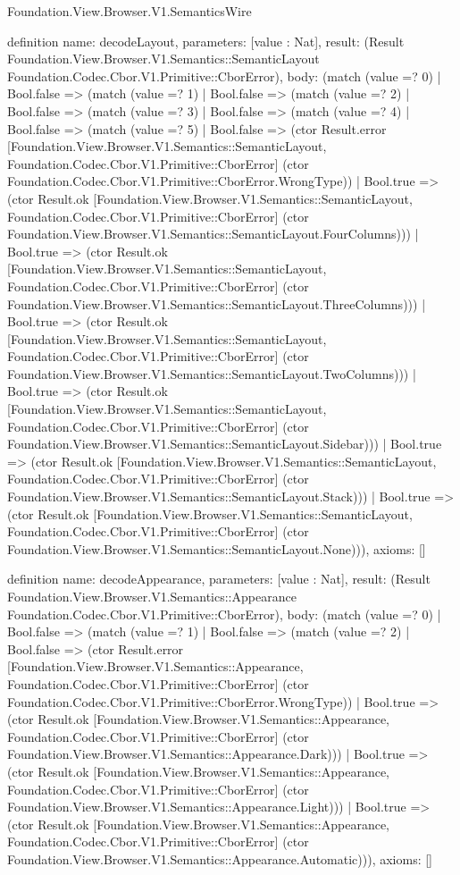 \begin{lexlean}{Foundation.View.Browser.V1.SemanticsWire}
\begin{semanticmodule}
definition{
  name: decodeLayout,
  parameters: [value : Nat],
  result: (Result Foundation.View.Browser.V1.Semantics::SemanticLayout Foundation.Codec.Cbor.V1.Primitive::CborError),
  body: (match (value =? 0)
    | Bool.false => (match (value =? 1)
      | Bool.false => (match (value =? 2)
        | Bool.false => (match (value =? 3)
          | Bool.false => (match (value =? 4)
            | Bool.false => (match (value =? 5)
              | Bool.false => (ctor Result.error [Foundation.View.Browser.V1.Semantics::SemanticLayout, Foundation.Codec.Cbor.V1.Primitive::CborError] (ctor Foundation.Codec.Cbor.V1.Primitive::CborError.WrongType))
              | Bool.true => (ctor Result.ok [Foundation.View.Browser.V1.Semantics::SemanticLayout, Foundation.Codec.Cbor.V1.Primitive::CborError] (ctor Foundation.View.Browser.V1.Semantics::SemanticLayout.FourColumns)))
            | Bool.true => (ctor Result.ok [Foundation.View.Browser.V1.Semantics::SemanticLayout, Foundation.Codec.Cbor.V1.Primitive::CborError] (ctor Foundation.View.Browser.V1.Semantics::SemanticLayout.ThreeColumns)))
          | Bool.true => (ctor Result.ok [Foundation.View.Browser.V1.Semantics::SemanticLayout, Foundation.Codec.Cbor.V1.Primitive::CborError] (ctor Foundation.View.Browser.V1.Semantics::SemanticLayout.TwoColumns)))
        | Bool.true => (ctor Result.ok [Foundation.View.Browser.V1.Semantics::SemanticLayout, Foundation.Codec.Cbor.V1.Primitive::CborError] (ctor Foundation.View.Browser.V1.Semantics::SemanticLayout.Sidebar)))
      | Bool.true => (ctor Result.ok [Foundation.View.Browser.V1.Semantics::SemanticLayout, Foundation.Codec.Cbor.V1.Primitive::CborError] (ctor Foundation.View.Browser.V1.Semantics::SemanticLayout.Stack)))
    | Bool.true => (ctor Result.ok [Foundation.View.Browser.V1.Semantics::SemanticLayout, Foundation.Codec.Cbor.V1.Primitive::CborError] (ctor Foundation.View.Browser.V1.Semantics::SemanticLayout.None))),
  axioms: []
}

definition{
  name: decodeAppearance,
  parameters: [value : Nat],
  result: (Result Foundation.View.Browser.V1.Semantics::Appearance Foundation.Codec.Cbor.V1.Primitive::CborError),
  body: (match (value =? 0)
    | Bool.false => (match (value =? 1)
      | Bool.false => (match (value =? 2)
        | Bool.false => (ctor Result.error [Foundation.View.Browser.V1.Semantics::Appearance, Foundation.Codec.Cbor.V1.Primitive::CborError] (ctor Foundation.Codec.Cbor.V1.Primitive::CborError.WrongType))
        | Bool.true => (ctor Result.ok [Foundation.View.Browser.V1.Semantics::Appearance, Foundation.Codec.Cbor.V1.Primitive::CborError] (ctor Foundation.View.Browser.V1.Semantics::Appearance.Dark)))
      | Bool.true => (ctor Result.ok [Foundation.View.Browser.V1.Semantics::Appearance, Foundation.Codec.Cbor.V1.Primitive::CborError] (ctor Foundation.View.Browser.V1.Semantics::Appearance.Light)))
    | Bool.true => (ctor Result.ok [Foundation.View.Browser.V1.Semantics::Appearance, Foundation.Codec.Cbor.V1.Primitive::CborError] (ctor Foundation.View.Browser.V1.Semantics::Appearance.Automatic))),
  axioms: []
}


\end{semanticmodule}
\end{lexlean}
